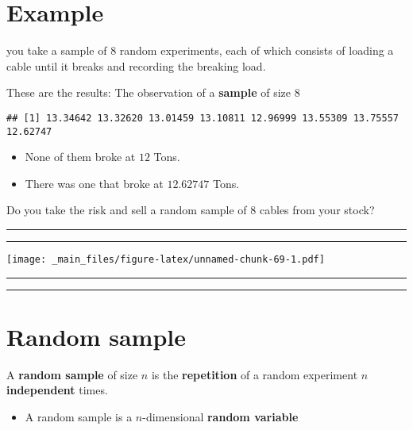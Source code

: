 \documentclass[
]{book}
\providecommand{\tightlist}{%
  \setlength{\itemsep}{0pt}\setlength{\parskip}{0pt}}
\begin{document}
\hypertarget{example-12}{%
\section{Example}\label{example-12}}

you take a sample of \(8\) random experiments, each of which consists of loading a cable until it breaks and recording the breaking load.

These are the results: The observation of a \textbf{sample} of size \(8\)

\begin{verbatim}
## [1] 13.34642 13.32620 13.01459 13.10811 12.96999 13.55309 13.75557 12.62747
\end{verbatim}

\begin{itemize}
\item
  None of them broke at \(12\) Tons.
\item
  There was one that broke at \(12.62747\) Tons.
\end{itemize}

Do you take the risk and sell a random sample of \(8\) cables from your stock?

\begin{center}\rule{0.5\linewidth}{0.5pt}\end{center}

\begin{center}\rule{0.5\linewidth}{0.5pt}\end{center}

\texttt{[image: \_main\_files/figure-latex/unnamed-chunk-69-1.pdf]}

\begin{center}\rule{0.5\linewidth}{0.5pt}\end{center}

\begin{center}\rule{0.5\linewidth}{0.5pt}\end{center}

\hypertarget{random-sample}{%
\section{Random sample}\label{random-sample}}

A \textbf{random sample} of size \(n\) is the \textbf{repetition} of a random experiment \(n\) \textbf{independent} times.

\begin{itemize}
\tightlist
\item
  A random sample is a \(n\)-dimensional \textbf{random variable}
\end{itemize}
\end{document}
